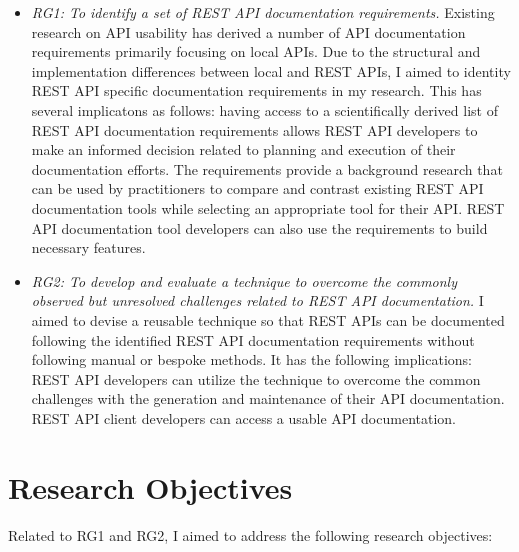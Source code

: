 \begin{itemize}
  \item \textit{RG1: To identify a set of REST API documentation requirements.} Existing research on API usability has derived a number of API documentation requirements primarily focusing on local APIs. Due to the structural and implementation differences between local and REST APIs, I aimed to identity REST API specific documentation requirements in my research. This has several implicatons as follows: having access to a scientifically derived list of REST API documentation requirements allows REST API developers to make an informed decision related to planning and execution of their documentation efforts. The requirements provide a background research that can be used by practitioners to compare and contrast existing REST API documentation tools while selecting an appropriate tool for their API. REST API documentation tool developers can also use the requirements to build necessary features.
  \item \textit{RG2: To develop and evaluate a technique to overcome the commonly observed but unresolved challenges related to REST API documentation.} I aimed to devise a reusable technique so that REST APIs can be documented following the identified REST API documentation requirements without following manual or bespoke methods. It has the following implications: REST API developers can utilize the technique to overcome the common challenges with the generation and maintenance of their API documentation. REST API client developers can access a usable API documentation.
\end{itemize}


\section{Research Objectives}
Related to RG1 and RG2, I aimed to address the following research objectives:

